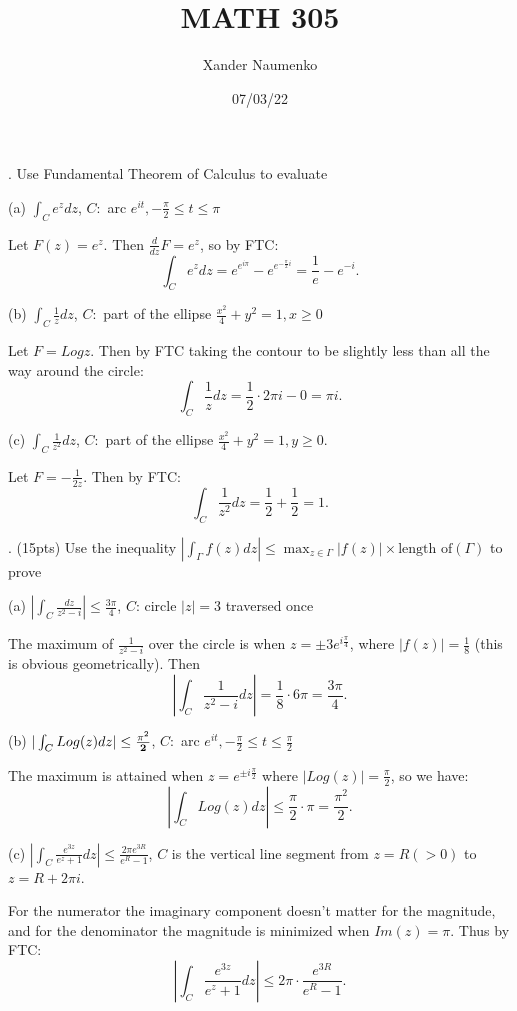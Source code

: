\documentclass[letterpaper, reqno,11pt]{article}
\begin{document}
\title{MATH 305}
\date{07/03/22}
\author{Xander Naumenko}
\maketitle

. Use Fundamental Theorem of Calculus to evaluate

(a) $\int_{C} e^z dz$, $C:$ arc $ e^{it}, -\frac{\pi}{2} \leq t \leq  \pi$

Let $F(z)=e^{z}$. Then $\frac{d}{dz}F=e^{z}$, so by FTC: 
\[
\int_C e^{z}dz=e^{e^{i\pi}}-e^{e^{-\frac{\pi}{2}i}}=\frac{1}{e}-e^{-i}
.\]

(b)   $\int_{C} \frac{1}{z} dz$, $C:$ part of the ellipse $ \frac{x^2}{4}+ y^2=1, x \geq 0$

Let $F=Log z$. Then by FTC taking the contour to be slightly less than all the way around the circle: 
 \[
\int_C \frac{1}{z}dz=\frac{1}{2}\cdot2\pi i-0=\pi i
.\]

(c) $ \int_{C} \frac{1}{ z^2} dz$, $C:$ part of the ellipse $ \frac{x^2}{4}+ y^2=1, y \geq 0$.

Let $F=-\frac{1}{2z}$. Then by FTC: 
\[
\int_C \frac{1}{z^2}dz=\frac{1}{2}+\frac{1}{2}=1
.\]



\medskip

. (15pts)  Use the inequality $ |\int_{\Gamma} f(z) dz| \leq \max_{z \in \Gamma} |f(z)| \times \mbox{length of} ( \Gamma)$ to prove

(a) $ | \int_{ C} \frac{dz}{ z^2-i} | \leq \frac{3\pi}{4}$, $C$: circle $ |z|=3$ traversed once

The maximum of $\frac{1}{z^2-i}$ over the circle is when $z=\pm 3e^{i\frac{\pi}{4}}$, where $|f(z)|=\frac{1}{8}$ (this is obvious geometrically). Then
\[
\left|\int_C \frac{1}{z^2-i}dz\right|=\frac{1}{8}\cdot 6\pi=\frac{3\pi}{4}
.\]

(b) $ |\int_{C} Log (z) dz | \leq \frac{\pi^2}{{\bf 2}}$, $C:$ arc $ e^{it}, -\frac{\pi}{2} \leq t \leq \frac{\pi}{2}$

The maximum is attained when $z=e^{\pm i\frac{\pi}{2}}$ where $|Log(z)|=\frac{\pi}{2}$, so we have: 
\[
\left|\int_C Log(z)dz\right|\leq \frac{\pi}{2}\cdot \pi=\frac{\pi^2}{2}
.\]

(c) $ |\int_{C} \frac{e^{3z}}{e^z+1} dz|\leq \frac{2\pi e^{3R}}{e^R-1}$, $C$ is the vertical line segment from $z=R (>0)$ to $ z= R+ 2\pi i $.

For the numerator the imaginary component doesn't matter for the magnitude, and for the denominator the magnitude is minimized when $Im(z)=\pi$. Thus by FTC:
\[
\left|\int_{C} \frac{e^{3z}}{e^{z}+1}dz\right|\leq 2\pi\cdot \frac{e^{3R}}{e^{R}-1}
.\]
\end{document}
